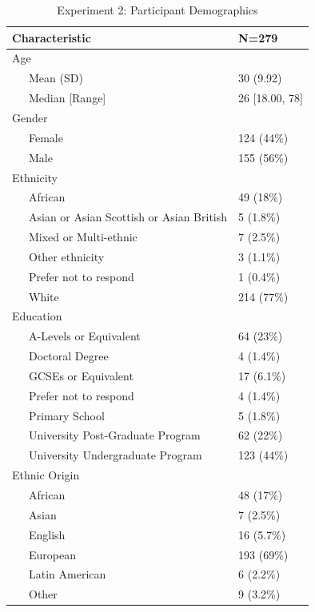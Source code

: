 \documentclass[
  donotrepeattitle,doc, 12pt, a4paper,floatsintext]{apa7}
\begin{document}
\begin{table}[h]
\begin{center}
\begin{threeparttable}
\caption{\label{tab:Experiment 2: Participant Demographics}Experiment 2: Participant Demographics}
\begin{tabular}{ll}
\toprule
Characteristic & N=279\\
\midrule
Age & \\
\ \ \ Mean (SD) & 30 (9.92)\\
\ \ \ Median [Range] & 26 [18.00, 78]\\
Gender & \\
\ \ \ Female & 124 (44\%)\\
\ \ \ Male & 155 (56\%)\\
Ethnicity & \\
\ \ \ African & 49 (18\%)\\
\ \ \ Asian  or  Asian Scottish  or  Asian British & 5 (1.8\%)\\
\ \ \ Mixed  or  Multi-ethnic & 7 (2.5\%)\\
\ \ \ Other ethnicity & 3 (1.1\%)\\
\ \ \ Prefer not  to respond & 1 (0.4\%)\\
\ \ \ White & 214 (77\%)\\
Education & \\
\ \ \ A-Levels  or  Equivalent & 64 (23\%)\\
\ \ \ Doctoral  Degree & 4 (1.4\%)\\
\ \ \ GCSEs  or  Equivalent & 17 (6.1\%)\\
\ \ \ Prefer not  to respond & 4 (1.4\%)\\
\ \ \ Primary School & 5 (1.8\%)\\
\ \ \ University  Post-Graduate  Program & 62 (22\%)\\
\ \ \ University  Undergraduate  Program & 123 (44\%)\\
Ethnic Origin & \\
\ \ \ African & 48 (17\%)\\
\ \ \ Asian & 7 (2.5\%)\\
\ \ \ English & 16 (5.7\%)\\
\ \ \ European & 193 (69\%)\\
\ \ \ Latin American & 6 (2.2\%)\\
\ \ \ Other & 9 (3.2\%)\\
\bottomrule
\end{tabular}
\end{threeparttable}
\end{center}
\end{table}
\end{document}
